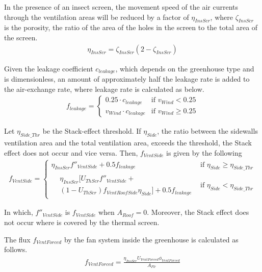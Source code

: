 \documentclass[a4paper]{article}
\numberwithin{equation}{section}
\begin{document}
In the presence of an insect screen, the movement speed of the air currents through the ventilation areas will be reduced by a factor of \(\eta_{InsScr}\), where \(\zeta_{InsScr}\) is the porosity, the ratio of the area of the holes in the screen to the total area of the screen.
\begin{align}
  \eta_{InsScr} = \zeta_{InsScr} (2 -  \zeta_{InsScr})
\end{align}

Given the leakage coefficient \(c_{leakage}\), which depends on the greenhouse type and is dimensionless, an amount of approximately half the leakage rate is added to the air-exchange rate, where leakage rate is calculated as below.
\begin{align}
  f_{leakage} = \begin{cases}
    0.25 \cdot c_{leakage}     & \text{if~} v_{Wind} < 0.25    \\
    v_{Wind} \cdot c_{leakage} & \text{if~} v_{Wind} \geq 0.25
  \end{cases}
\end{align}

Let \(\eta_{Side\_Thr}\) be the Stack-effect threshold. If \(\eta_{Side}\), the ratio between the sidewalls ventilation
area and the total ventilation area, exceeds the threshold, the Stack effect does not occur and vice versa. Then, \(f_{VentSide}\) is given by the following
\begin{gather}
  f_{VentSide} =
  \begin{cases}
    \eta_{InsScr} f''_{VentSide} + 0.5f_{leakage} & \text{if~} \eta_{Side} \geq \eta_{Side\_Thr} \\
    \begin{split}
      & \eta_{InsScr} [U_{ThScr}f''_{VentSide} + \\
      & (1-U_{ThScr})f_{VentRoofSide} \eta_{Side}] + 0.5 f_{leakage}
    \end{split}                    & \text{if~} \eta_{Side} < \eta_{Side\_Thr}
  \end{cases}
\end{gather}

In which,  \(f''_{VentSide}\) is  \(f_{VentSide}\) when \(A_{Roof} = 0\).
Moreover, the Stack effect does not occur where is covered by the thermal screen.

The flux \(f_{VentForced}\) by the fan system inside the greenhouse is calculated as follows.
\begin{align}
  f_{VentForced} = \frac{\eta_{InsScr} U_{VentForced} \phi_{VentForced} } {A_{Flr}}
\end{align}
\end{document}
